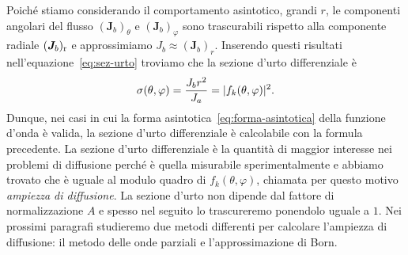 \documentclass[a4paper,fleqn,twoside,12pt]{article}
\renewcommand{\phi}{\varphi}
\DeclarePairedDelimiter{\abs}{\lvert}{\rvert}
\begin{document}
Poiché stiamo considerando il comportamento asintotico, grandi $r$, le
componenti angolari del flusso $(\bm{J}_{b})_{\theta}$ e $(\bm{J}_{b})_{\phi}$
sono trascurabili rispetto alla componente radiale $(\bm{J}_{b})_{\textup{r}}$ e
approssimiamo $J_{b} \approx (\bm{J}_{b})_{r}$.  Inserendo questi risultati
nell'equazione~\eqref{eq:sez-urto} troviamo che la sezione d'urto differenziale
è
\begin{equation}
  \label{eq:sez-urto-mq}
  \sigma(\theta,\phi) = \frac{J_{b}r^{2}}{J_{a}} = \abs{f_{k}(\theta,\phi)}^{2}.
\end{equation}
Dunque, nei casi in cui la forma asintotica~\eqref{eq:forma-asintotica} della
funzione d'onda è valida, la sezione d'urto differenziale è calcolabile con la
formula precedente.  La sezione d'urto differenziale è la quantità di maggior
interesse nei problemi di diffusione perché è quella misurabile sperimentalmente
e abbiamo trovato che è uguale al modulo quadro di $f_{k}(\theta,\phi)$,
chiamata per questo motivo \emph{ampiezza di diffusione}.  La sezione d'urto non
dipende dal fattore di normalizzazione $A$ e spesso nel seguito lo trascureremo
ponendolo uguale a $1$.  Nei prossimi paragrafi studieremo due metodi differenti
per calcolare l'ampiezza di diffusione: il metodo delle onde parziali e
l'approssimazione di Born.
\end{document}
